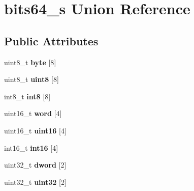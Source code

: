 \hypertarget{unionbits64__s}{}\section{bits64\+\_\+s Union Reference}
\label{unionbits64__s}
\subsection*{Public Attributes}
\begin{DoxyCompactItemize}
\item 
uint8\+\_\+t {\bfseries byte} \mbox{[}8\mbox{]}\hypertarget{unionbits64__s_a344daa9a96941a95e121a2a156444088}{}\label{unionbits64__s_a344daa9a96941a95e121a2a156444088}

\item 
uint8\+\_\+t {\bfseries uint8} \mbox{[}8\mbox{]}\hypertarget{unionbits64__s_aa1deae37474f4b3a09a9d95012289c37}{}\label{unionbits64__s_aa1deae37474f4b3a09a9d95012289c37}

\item 
int8\+\_\+t {\bfseries int8} \mbox{[}8\mbox{]}\hypertarget{unionbits64__s_ac2a4a500d1575c4c740aed8bfc4af7dc}{}\label{unionbits64__s_ac2a4a500d1575c4c740aed8bfc4af7dc}

\item 
uint16\+\_\+t {\bfseries word} \mbox{[}4\mbox{]}\hypertarget{unionbits64__s_aeb197b51b01b758924e66ee2d54a4801}{}\label{unionbits64__s_aeb197b51b01b758924e66ee2d54a4801}

\item 
uint16\+\_\+t {\bfseries uint16} \mbox{[}4\mbox{]}\hypertarget{unionbits64__s_a2959e9fa320544bc4071e85f48dc184c}{}\label{unionbits64__s_a2959e9fa320544bc4071e85f48dc184c}

\item 
int16\+\_\+t {\bfseries int16} \mbox{[}4\mbox{]}\hypertarget{unionbits64__s_a60c8fbf2660498a495db9132abf9a7ba}{}\label{unionbits64__s_a60c8fbf2660498a495db9132abf9a7ba}

\item 
uint32\+\_\+t {\bfseries dword} \mbox{[}2\mbox{]}\hypertarget{unionbits64__s_a4e93beedb02f7946a822b322b1b223a3}{}\label{unionbits64__s_a4e93beedb02f7946a822b322b1b223a3}

\item 
uint32\+\_\+t {\bfseries uint32} \mbox{[}2\mbox{]}\hypertarget{unionbits64__s_a9c026978baedf71f7d587d8dba3d81bb}{}\label{unionbits64__s_a9c026978baedf71f7d587d8dba3d81bb}


\end{DoxyCompactItemize}
